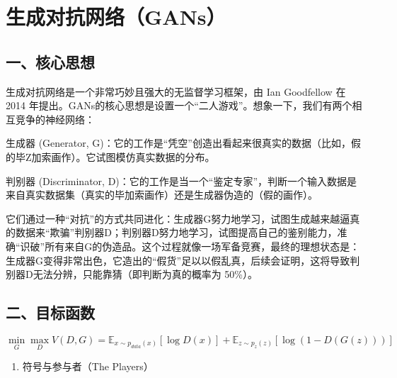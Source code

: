 \setcounter{section}{0}

\hypertarget{ux751fux6210ux5bf9ux6297ux7f51ux7edcgans}{%
\section{生成对抗网络（GANs）}\label{ux751fux6210ux5bf9ux6297ux7f51ux7edcgans}}

\hypertarget{ux4e00ux6838ux5fc3ux601dux60f3-2}{%
\subsection{一、核心思想}\label{ux4e00ux6838ux5fc3ux601dux60f3-2}}

生成对抗网络是一个非常巧妙且强大的无监督学习框架，由 Ian Goodfellow 在 2014 年提出。GANs的核心思想是设置一个``二人游戏''。想象一下，我们有两个相互竞争的神经网络：

生成器 (Generator, G)：它的工作是``凭空''创造出看起来很真实的数据（比如，假的毕Z加索画作）。它试图模仿真实数据的分布。

判别器 (Discriminator, D)：它的工作是当一个``鉴定专家''，判断一个输入数据是来自真实数据集（真实的毕加索画作）还是生成器伪造的（假的画作）。

它们通过一种``对抗''的方式共同进化：生成器G努力地学习，试图生成越来越逼真的数据来``欺骗''判别器D；判别器D努力地学习，试图提高自己的鉴别能力，准确``识破''所有来自G的伪造品。这个过程就像一场军备竞赛，最终的理想状态是：生成器G变得非常出色，它造出的``假货''足以以假乱真，后续会证明，这将导致判别器D无法分辨，只能靠猜（即判断为真的概率为 50\%）。

\hypertarget{ux4e8cux76eeux6807ux51fdux6570}{%
\subsection{二、目标函数}\label{ux4e8cux76eeux6807ux51fdux6570}}

\[
\min_G \max_D V(D, G)=\mathbb{E}_{x\sim p_{data}(x)}[\log D(x)] + \mathbb{E}_{z\sim p_z(z)}[\log(1 - D(G(z)))]
\]

\begin{enumerate}
\def\labelenumi{\arabic{enumi}.}
\tightlist
\item
  符号与参与者（The Players）
\end{enumerate}

